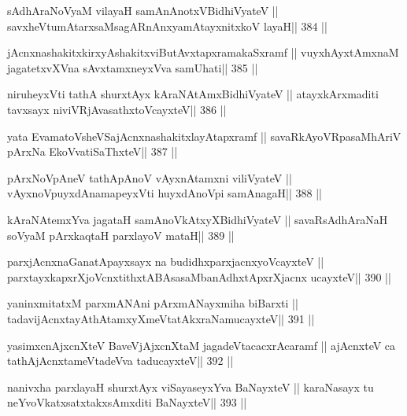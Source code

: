 \begin{shl}
sAdhAraNoV\s yaM vilayaH samAnAnotxV\s BidhiVyateV ||
savxheVtumAtarxsaMsagARnAnxyamAtayxnitxkoV layaH\hfill || 384 ||
\end{shl}

\begin{shl}
jAcnxnashakitxkirxyAshakitxviButAvxtapxramakaSxramf ||
vuyxhAyx\s\s tAmxnaM jagatetxvXVna sAvxtamxneyxVva samUhati\hfill || 385 ||
\end{shl}

\begin{shl}
niruheyxVti tathA shurxtAyx kAraNAtAmx\s BidhiVyateV ||
atayxkArxmaditi tavxsayx niviVRjAvasathxtoVcayxteV\hfill || 386 ||
\end{shl}

\begin{shl}
yata EvamatoV\s sheVSajAcnxnashakitxlayAtapxramf ||
savaRkAyoVRpasaMhAriV pArxNa EkoV\s vatiSaThxteV\hfill || 387 ||
\end{shl}

\begin{shl}
pArxNoV\s pAneV tathA\s pAnoV vAyxnAtamxni viliVyateV ||
vAyxnoV\s puyxdAnamapeyxVti huyxdAnoV\s pi samAnagaH\hfill || 388 ||
\end{shl}

\begin{shl}
kAraNAtemxYva jagataH samAnoVkAtxyX\s BidhiVyateV ||
savaRsAdhAraNaH soV\s yaM pArxkaqtaH parxlayoV mataH\hfill || 389 ||
\end{shl}

\begin{shl}
parxjAcnxnaGanatA\s payxsayx na budidhxparxjacnxyoVcayxteV ||
parxtayxkapxrXjoVcnxtithxtABAsasaMbanAdhxtApxrXjacnx ucayxteV\hfill || 390 ||
\end{shl}

\begin{shl}
yaninxmitatxM parxmANAni pArxmANayxmiha biBarxti ||
tadavijAcnxtayAthAtamxyXmeVtatAkxraNamucayxteV\hfill || 391 ||
\end{shl}

\begin{shl}
yasimxcnAjxcnXteV BaveVjAjxcnXtaM jagadeVtacacxrAcaramf ||
ajAcnxteV ca tathA\s jAcnxtameVtadeVva taducayxteV\hfill || 392 ||
\end{shl}

\begin{shl}
nanivxha parxlayaH shurxtAyx viSayaseyxYva BaNayxteV ||
karaNasayx tu neYvoVkatxsatxtakxsAmxditi BaNayxteV\hfill || 393 ||
\end{shl}

